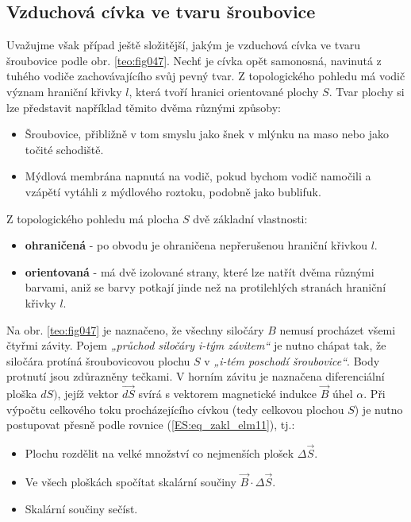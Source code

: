       \subsection{Vzduchová cívka ve tvaru šroubovice}
        Uvažujme však případ ještě složitější, jakým je vzduchová cívka ve tvaru šroubovice podle 
        obr. \ref{teo:fig047}. Nechť je cívka opět samonosná, navinutá z tuhého 
        vodiče zachovávajícího svůj pevný tvar. Z topologického pohledu má vodič význam hraniční 
        křivky \(l\), která tvoří hranici orientované plochy \(S\). Tvar plochy si lze představit 
        například těmito dvěma různými způsoby:


        \begin{itemize}[noitemsep]
          \item Šroubovice, přibližně v tom smyslu jako šnek v mlýnku na maso nebo jako točité 
                schodiště.          
          \item Mýdlová membrána napnutá na vodič, pokud bychom vodič namočili a vzápětí vytáhli
                z mýdlového roztoku, podobně jako bublifuk.
        \end{itemize}
        Z topologického pohledu má plocha \(S\) dvě základní vlastnosti:
        \begin{itemize}[noitemsep]
          \item \textbf{ohraničená} - po obvodu je ohraničena nepřerušenou hraniční křivkou \(l\).
          \item \textbf{orientovaná} - má dvě izolované strany, které lze natřít dvěma různými 
                barvami, aniž se barvy potkají jinde než na protilehlých stranách hraniční křivky 
                \(l\).
        \end{itemize}
         
        Na obr. \ref{teo:fig047} je naznačeno, že všechny siločáry \(B\) nemusí procházet všemi
        čtyřmi závity. Pojem \emph{„průchod siločáry i-tým závitem“} je nutno chápat tak, že
        siločára protíná šroubovicovou plochu \(S\) v \emph{„i-tém poschodí šroubovice“}. Body
        protnutí jsou zdůrazněny tečkami. V horním závitu je naznačena diferenciální ploška \(dS)\),
        jejíž vektor \(\vec{dS}\) svírá s vektorem magnetické indukce \(\vec{B}\) úhel \(\alpha\).
        Při výpočtu celkového toku procházejícího cívkou (tedy celkovou plochou \(S\)) je nutno
        postupovat přesně podle rovnice (\ref{ES:eq_zakl_elm11}), tj.:
        \begin{itemize}[noitemsep]
          \item Plochu rozdělit na velké množství co nejmenších plošek \(\Delta\vec{S}\).
          \item Ve všech ploškách spočítat skalární součiny \(\vec{B}\cdot\Delta\vec{S}\).
          \item Skalární součiny sečíst.
        \end{itemize}
        
